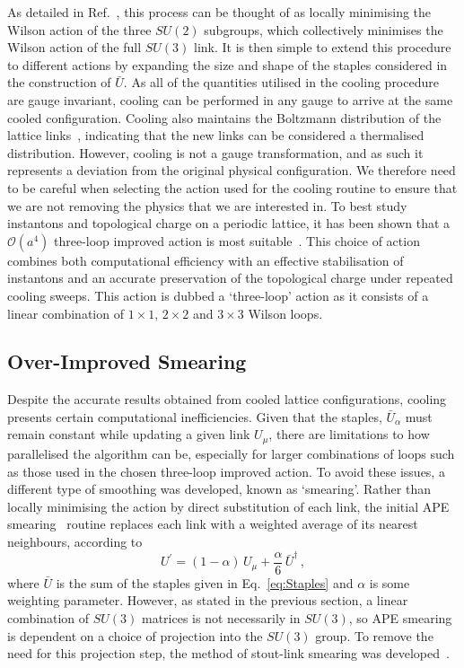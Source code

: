 As detailed in Ref.~\cite{Bonnet:2000dc}, this process can be thought of as locally minimising the Wilson action of the three $SU(2)$ subgroups, which collectively minimises the Wilson action of the full $SU(3)$ link. It is then simple to extend this procedure to different actions by expanding the size and shape of the staples considered in the construction of $\bar{U}$. As all of the quantities utilised in the cooling procedure are gauge invariant, cooling can be performed in any gauge to arrive at the same cooled configuration. Cooling also maintains the Boltzmann distribution of the lattice links~\cite{Cabibbo:1982zn}, indicating that the new links can be considered a thermalised distribution. However, cooling is not a gauge transformation, and as such it represents a deviation from the original physical configuration. We therefore need to be careful when selecting the action used for the cooling routine to ensure that we are not removing the physics that we are interested in. To best study instantons and topological charge on a periodic lattice, it has been shown that a $\mathcal{O}(a^4)$ three-loop  improved action is most suitable~\cite{BilsonThompson:2002jk}. This choice of action combines both computational efficiency with an effective stabilisation of instantons and an accurate preservation of the topological charge under repeated cooling sweeps. This action is dubbed a `three-loop' action as it consists of a linear combination of $1\times 1$, $2\times 2$ and $3\times 3$ Wilson loops.

\subsection{Over-Improved Smearing}
Despite the accurate results obtained from cooled lattice configurations, cooling presents certain computational inefficiencies. Given that the staples, $\bar{U}_\alpha$ must remain constant while updating a given link $U_\mu$, there are limitations to how  parallelised the algorithm can be, especially for larger combinations of loops such as those used in the chosen three-loop improved action. To avoid these issues, a different type of smoothing was developed, known as `smearing'. Rather than locally minimising the action by direct substitution of each link, the initial APE smearing~\cite{Albanese:1987ds, Falcioni:1984ei} routine replaces each link with a weighted average of its nearest neighbours, according to
%
\begin{equation}
U^\prime = (1-\alpha)\,U_\mu + \frac{\alpha}{6}\,\bar{U}^\dagger\, ,
\end{equation}
%
where $\bar{U}$ is the sum of the staples given in Eq.~\ref{eq:Staples} and $\alpha$ is some weighting parameter. However, as stated in the previous section, a linear combination of $SU(3)$ matrices is not necessarily in $SU(3)$, so APE smearing is dependent on a choice of projection into the $SU(3)$ group. To remove the need for this projection step, the method of stout-link smearing was developed~\cite{Morningstar:2003gk}.\\

